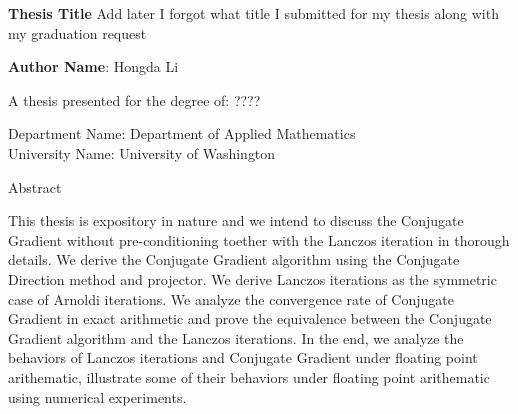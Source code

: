 \documentclass[]{article}
\theoremstyle{definition}
\begin{document}
\begin{center}
    \vspace*{1cm}
    \textbf{Thesis Title}
        Add later I forgot what title I submitted for my thesis along with my graduation request
    \vspace{1.5cm}

    \textbf{Author Name}: Hongda Li

    \vfill
         
    A thesis presented for the degree of: ???? 
         
    \vspace{0.8cm}
         
    Department Name: Department of Applied Mathematics\\

    University Name: University of Washington\\

    

\end{center}

    \begin{center}
        Abstract
    \end{center}

    This thesis is expository in nature and we intend to discuss the Conjugate Gradient without pre-conditioning toether with the Lanczos iteration in thorough details. We derive the Conjugate Gradient algorithm using the Conjugate Direction method and projector. We derive Lanczos iterations as the symmetric case of Arnoldi iterations. We analyze the convergence rate of Conjugate Gradient in exact arithmetic and prove the equivalence between the Conjugate Gradient algorithm and the Lanczos iterations. In the end, we analyze the behaviors of Lanczos iterations and Conjugate Gradient under floating point arithematic, illustrate some of their behaviors under floating point arithematic using numerical experiments. 
         

\newpage
\tableofcontents

\newpage 
\end{document}
